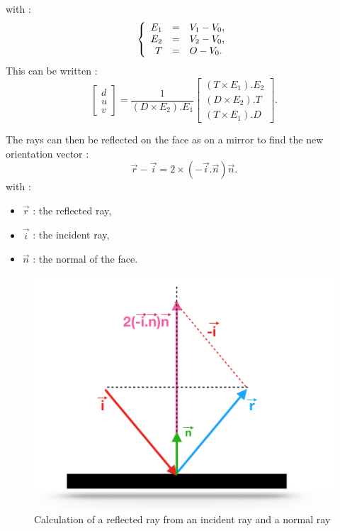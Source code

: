 \documentclass[AMA,STIX1COL]{WileyNJD-v2}
\begin{document}
%
with : 
\begin{equation}
   \left \{
   \begin{array}{r c l}
E_1 &=&  V_1-V_0,  \\
E_2 &=&  V_2-V_0,  \\
T &=& O - V_0.
   \end{array}
   \right .
\end{equation}
%
This can be written : 
%
\begin{equation}
	\begin{bmatrix}
 	 d \\
	 u \\
	 v
	\end{bmatrix}
	=
	\frac{1}{
 	  (D \times E_2).E_1
	}
	\begin{bmatrix}
 		  (T \times E_1).E_2
 \\ 
 		  (D \times E_2).T
 \\
 		  (T \times E_1).D
	\end{bmatrix}	.
\end{equation}

The rays can then be reflected on the face as on a mirror to find the new orientation vector :
\begin{equation}
\overrightarrow{r} - \overrightarrow{i} = 2 \times (-\overrightarrow{i}.\overrightarrow{n})\overrightarrow{n}.
\end{equation}
with : 
\begin{itemize}
\item $\overrightarrow{r}$ : the reflected ray,
\item $\overrightarrow{i}$ : the incident ray,
\item $\overrightarrow{n}$ : the normal of the face.
\end{itemize}

\begin{figure}
\centering
	\includegraphics[width=0.4\linewidth]{rayRefl}
	\caption{Calculation of a reflected ray from an incident ray and a normal ray}
	\label{rayRefl}
\end{figure}
\end{document}
